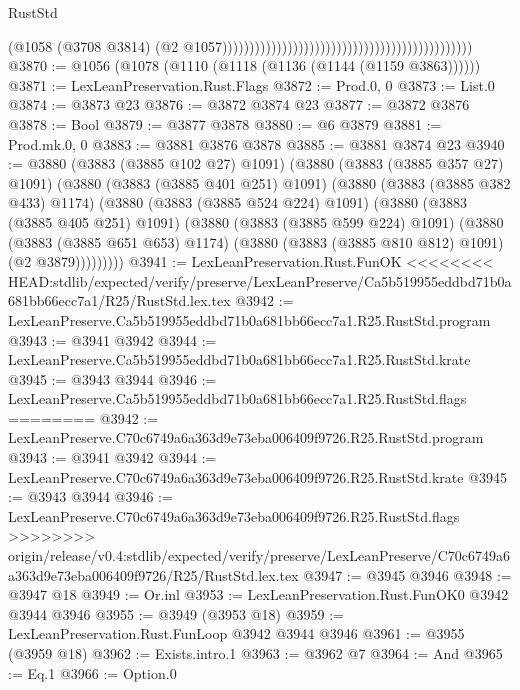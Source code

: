 \begin{lexlean}{RustStd}
\begin{coremodule}
{\begin{coremodule}
{{{{{{{{{{{{{{{{{{{{{{{{{{{{{{{{{{{{{{                                                                                            (@1058
                                                                                              (@3708
                                                                                                @3814)
                                                                                              (@2
                                                                                                @1057))))))))))))))))))))))))))))))))))))))))))))))
@3870 := @1056 (@1078 (@1110 (@1118 (@1136 (@1144 (@1159 @3863))))))
@3871 := LexLeanPreservation.Rust.Flags
@3872 := Prod.{0, 0}
@3873 := List.{0}
@3874 := @3873 @23
@3876 := @3872 @3874 @23
@3877 := @3872 @3876
@3878 := Bool
@3879 := @3877 @3878
@3880 := @6 @3879
@3881 := Prod.mk.{0, 0}
@3883 := @3881 @3876 @3878
@3885 := @3881 @3874 @23
@3940 := @3880
    (@3883 (@3885 @102 @27) @1091)
    (@3880
      (@3883 (@3885 @357 @27) @1091)
      (@3880
        (@3883 (@3885 @401 @251) @1091)
        (@3880
          (@3883 (@3885 @382 @433) @1174)
          (@3880
            (@3883 (@3885 @524 @224) @1091)
            (@3880
              (@3883 (@3885 @405 @251) @1091)
              (@3880
                (@3883 (@3885 @599 @224) @1091)
                (@3880
                  (@3883 (@3885 @651 @653) @1174)
                  (@3880 (@3883 (@3885 @810 @812) @1091) (@2 @3879)))))))))
@3941 := LexLeanPreservation.Rust.FunOK
<<<<<<<< HEAD:stdlib/expected/verify/preserve/LexLeanPreserve/Ca5b519955eddbd71b0a681bb66ecc7a1/R25/RustStd.lex.tex
@3942 := LexLeanPreserve.Ca5b519955eddbd71b0a681bb66ecc7a1.R25.RustStd.program
@3943 := @3941 @3942
@3944 := LexLeanPreserve.Ca5b519955eddbd71b0a681bb66ecc7a1.R25.RustStd.krate
@3945 := @3943 @3944
@3946 := LexLeanPreserve.Ca5b519955eddbd71b0a681bb66ecc7a1.R25.RustStd.flags
========
@3942 := LexLeanPreserve.C70c6749a6a363d9e73eba006409f9726.R25.RustStd.program
@3943 := @3941 @3942
@3944 := LexLeanPreserve.C70c6749a6a363d9e73eba006409f9726.R25.RustStd.krate
@3945 := @3943 @3944
@3946 := LexLeanPreserve.C70c6749a6a363d9e73eba006409f9726.R25.RustStd.flags
>>>>>>>> origin/release/v0.4:stdlib/expected/verify/preserve/LexLeanPreserve/C70c6749a6a363d9e73eba006409f9726/R25/RustStd.lex.tex
@3947 := @3945 @3946
@3948 := @3947 @18
@3949 := Or.inl
@3953 := LexLeanPreservation.Rust.FunOK0 @3942 @3944 @3946
@3955 := @3949 (@3953 @18)
@3959 := LexLeanPreservation.Rust.FunLoop @3942 @3944 @3946
@3961 := @3955 (@3959 @18)
@3962 := Exists.intro.{1}
@3963 := @3962 @7
@3964 := And
@3965 := Eq.{1}
@3966 := Option.{0}
}}}}}}}}}}}}}}}}}}}}}}}}}}}}}}}}}}}}}}
\end{coremodule}}
\end{coremodule}
\end{lexlean}
